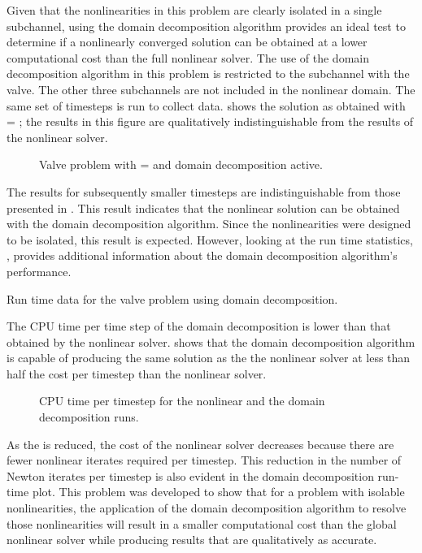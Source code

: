 Given that the nonlinearities in this problem are clearly isolated in a single subchannel, using the domain decomposition algorithm provides an ideal test to determine if a nonlinearly converged solution can be obtained at a lower computational cost than the full nonlinear solver.
The use of the domain decomposition algorithm in this problem is restricted to the subchannel with the valve.
The other three subchannels are not included in the nonlinear domain.
The same set of timesteps is run to collect data.
 shows the solution as obtained with \dtmax{} = ; the results in this figure are qualitatively indistinguishable from the results of the nonlinear solver.

\begin{figure}[h!tb]
\centering

\caption{Valve problem with \dtmax{} =  and domain decomposition active.}
\label{fig:valveDom6pt25em02}
\end{figure}

The results for subsequently smaller timesteps are indistinguishable from those presented in .
This result indicates that the nonlinear solution can be obtained with the domain decomposition algorithm.
Since the nonlinearities were designed to be isolated, this result is expected.
However, looking at the run time statistics, , provides additional information about the domain decomposition algorithm's performance.

\begin{table}[h!tb]
\centering
\singlespace

\caption{Run time data for the valve problem using domain decomposition.}
\label{tab:valveDomTable}
\end{table}

The CPU time per time step of the domain decomposition is lower than that obtained by the nonlinear solver.
 shows that the domain decomposition algorithm is capable of producing the same solution as the the nonlinear solver at less than half the cost per timestep than the nonlinear solver.

\begin{figure}[h!tb]
\centering

\caption{CPU time per timestep for the nonlinear and the domain decomposition runs.}
\label{fig:valveRunTime}
\end{figure}

As the \dtmax{} is reduced, the cost of the nonlinear solver decreases because there are fewer nonlinear iterates required per timestep.
This reduction in the number of Newton iterates per timestep is also evident in the domain decomposition run-time plot.
This problem was developed to show that for a problem with isolable nonlinearities, the application of the domain decomposition algorithm to resolve those nonlinearities will result in a smaller computational cost than the global nonlinear solver while producing results that are qualitatively as accurate.

